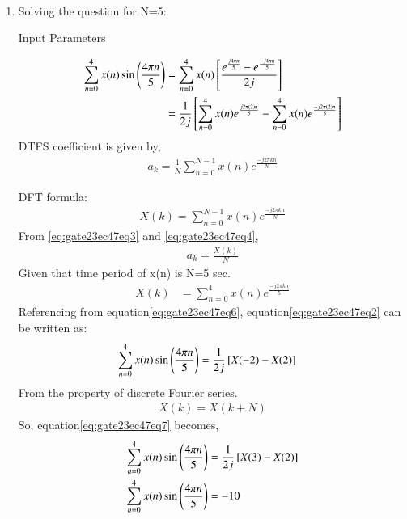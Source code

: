 \documentclass[journal,12pt,onecolumn]{IEEEtran}
\theoremstyle{remark}
\begin{document}
\solution\\
\begin{enumerate}
\item Solving the question for N=5:
\begin{table}[h]
 	\centering
 	\resizebox{6 cm}{!}{
 		
 	}
 	\vspace{6 pt}
 	\caption{Input Parameters}
 	\label{eq:gate23ec47tab2}
 \end{table} 
\begin{align}
\sum\limits_{n=0}^{4}x(n) \sin\left(\frac{4\pi n}{5}\right)&=\sum\limits_{n=0}^{4}x(n){}\left[\frac{e^{\frac{j4\pi n}{5}}-e^{\frac{-j4\pi n}{5}}}{2j}\right]\\
&=\frac{1}{2j}{}\left[\sum\limits_{n=0}^{4}x(n)e^{\frac{j2\pi (2)n}{5}}-\sum\limits_{n=0}^{4}x(n)e^{\frac{-j2\pi (2)n}{5}}\right]\label{eq:gate23ec47eq2}
\end{align}
DTFS coefficient is given by,\\
\begin{align}
a_k=\frac{1}{N}\sum\limits_{n=0}^{N-1} x(n)e^{\frac{-j2\pi kn}{N}}\label{eq:gate23ec47eq3}
\end{align}

DFT formula:
\begin{align}
X(k)=\sum\limits_{n=0}^{N-1} x(n)e^{\frac{-j2\pi kn}{N}}\label{eq:gate23ec47eq4}
\end{align}
From \eqref{eq:gate23ec47eq3} and \eqref{eq:gate23ec47eq4},
\begin{align}
a_k=\frac{X(k)}{N}
\end{align}
Given that time period of x(n) is N=5 sec.\\
\begin{align}
X(k)&=\sum\limits_{n=0}^{4} x(n)e^{\frac{-j2\pi kn}{5}}\label{eq:gate23ec47eq6}
\end{align}
Referencing from equation\eqref{eq:gate23ec47eq6}, equation\eqref{eq:gate23ec47eq2} can be written as:
\begin{align}
\sum\limits_{n=0}^{4}x(n) \sin\left(\frac{4\pi n}{5}\right)&=\frac{1}{2j}{}\left[X(-2)-X(2)\right]\label{eq:gate23ec47eq7}
\end{align}
From the property of discrete Fourier series.\\
\begin{align}
X(k)=X(k+N)
\end{align}
So, equation\eqref{eq:gate23ec47eq7} becomes,\\
\begin{align}
\sum\limits_{n=0}^{4}x(n) \sin\left(\frac{4\pi n}{5}\right)&=\frac{1}{2j}{}\left[X(3)-X(2)\right]\\
\sum\limits_{n=0}^{4}x(n) \sin\left(\frac{4\pi n}{5}\right)&=-10
\end{align}



\end{enumerate}
\end{document}
